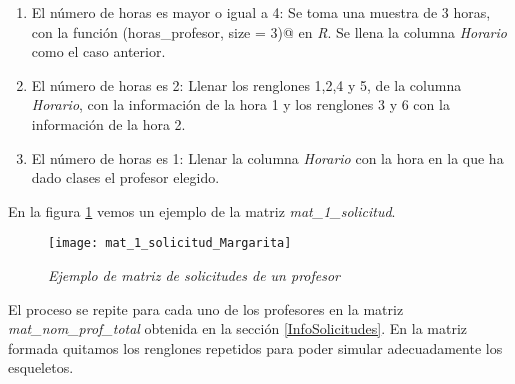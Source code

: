 \begin{enumerate}
\begin{enumerate}
\item El número de horas es mayor o igual a 4: Se toma una muestra de 3 horas, con la función \verb@sample(horas_profesor, size = 3)@ en \textit{R}. Se llena la columna \textit{Horario} como el caso anterior.

\item El número de horas es 2: Llenar los renglones 1,2,4 y 5, de la columna \textit{Horario}, con la información de la hora 1 y los renglones 3 y 6 con la información de la hora 2.

\item El número de horas es 1: Llenar la columna \textit{Horario} con la hora en la que ha dado clases el profesor elegido.
\end{enumerate}


\end{enumerate}

En la figura \ref{mat_1_solicitud_Margarita} vemos un ejemplo de la matriz \textit{mat\_1\_solicitud}.

\begin{figure}[H]
\centering
\texttt{[image: mat\_1\_solicitud\_Margarita]} %
\caption{\textit{Ejemplo de matriz de solicitudes de un profesor}}\label{mat_1_solicitud_Margarita}
\end{figure}

El proceso se repite para cada uno de los profesores en la matriz \textit{mat\_nom\_prof\_total} obtenida en la sección \ref{InfoSolicitudes}. En la matriz formada quitamos los renglones repetidos para poder simular adecuadamente los esqueletos.
